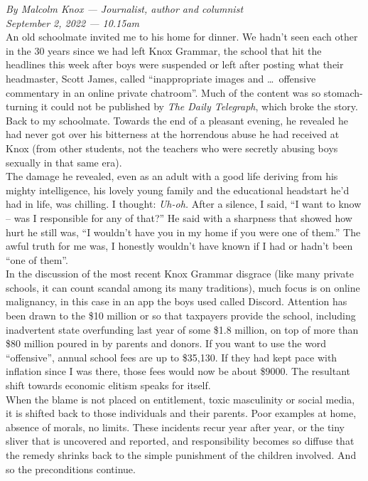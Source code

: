 \documentclass[a4paper]{article}
\begin{document}
\textit{By Malcolm Knox — Journalist, author and columnist\\September 2, 2022 — 10.15am}\\

An old schoolmate invited me to his home for dinner. We hadn’t seen each other in the 30 years since we had left Knox Grammar, the school that hit the headlines this week after boys were suspended or left after posting what their headmaster, Scott James, called ``inappropriate images and \ldots\ offensive commentary in an online private chatroom''. Much of the content was so stomach-turning it could not be published by \textit{The Daily Telegraph}, which broke the story.\\

Back to my schoolmate. Towards the end of a pleasant evening, he revealed he had never got over his bitterness at the horrendous abuse he had received at Knox (from other students, not the teachers who were secretly abusing boys sexually in that same era).\\

The damage he revealed, even as an adult with a good life deriving from his mighty intelligence, his lovely young family and the educational headstart he’d had in life, was chilling. I thought: \textit{Uh-oh.} After a silence, I said, ``I want to know – was I responsible for any of that?'' He said with a sharpness that showed how hurt he still was, ``I wouldn’t have you in my home if you were one of them.'' The awful truth for me was, I honestly wouldn’t have known if I had or hadn’t been ``one of them''.\\

In the discussion of the most recent Knox Grammar disgrace (like many private schools, it can count scandal among its many traditions), much focus is on online malignancy, in this case in an app the boys used called Discord. Attention has been drawn to the \$10 million or so that taxpayers provide the school, including inadvertent state overfunding last year of some \$1.8 million, on top of more than \$80 million poured in by parents and donors. If you want to use the word ``offensive'', annual school fees are up to \$35,130. If they had kept pace with inflation since I was there, those fees would now be about \$9000. The resultant shift towards economic elitism speaks for itself.\\

When the blame is not placed on entitlement, toxic masculinity or social media, it is shifted back to those individuals and their parents. Poor examples at home, absence of morals, no limits. These incidents recur year after year, or the tiny sliver that is uncovered and reported, and responsibility becomes so diffuse that the remedy shrinks back to the simple punishment of the children involved. And so the preconditions continue.\\
\end{document}

